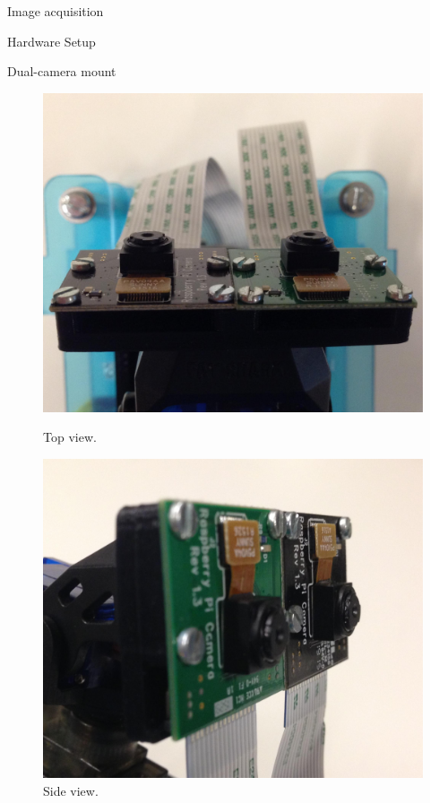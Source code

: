 \documentclass[10pt]{article}
\begin{document}
\begin{section}{Image acquisition}
\begin{subsection}{Hardware Setup}
\begin{subsubsection}{Dual-camera mount}
            \begin{figure}[!h]
                \centering
                \begin{minipage}[b]{0.35\textwidth}
                    \includegraphics[width=\textwidth]{fig/dual_camera_no_filter_top_view.jpg}
                    \caption{Top view.}
                \end{minipage} \hspace{0.5em} %
                \begin{minipage}[b]{0.35\textwidth}
                    \includegraphics[width=\textwidth]{fig/dual_camera_no_filter_side_view.jpg}
                    \caption{Side view.}
                \end{minipage}
            \end{figure}


\end{subsubsection}
\end{subsection}
\end{section}
\end{document}
